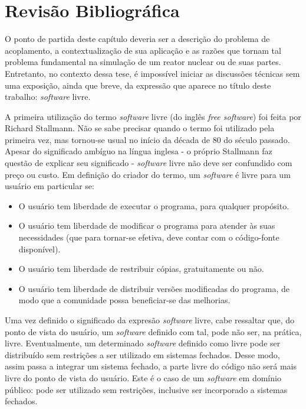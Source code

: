 \chapter{Revisão Bibliográfica}
\label{chap:rev}


O ponto de partida deste capítulo deveria ser a descrição do problema de acoplamento,
a contextualização de sua aplicação e as razões que tornam tal problema fundamental
na simulação de um reator nuclear ou de suas partes. Entretanto, no contexto dessa tese, é impossível
iniciar as discussões técnicas sem uma exposição, ainda que breve, da expressão que
aparece no título deste trabalho: \textit{software} livre.

A primeira utilização do termo \textit{software} livre (do inglês \textit{free software})
foi feita por Richard Stallmann. Não se sabe precisar quando o termo foi utilizado pela
primeira vez, mas tornou-se usual no início da década de 80 do século passado.
Apesar do significado ambíguo na língua inglesa - o próprio Stallmann faz questão
de explicar seu significado \cite{Stallman2002} - \textit{software} livre não deve
ser confundido com preço ou custo. Em definição do criador do termo, um \textit{software}
é livre para um usuário em particular se:
\begin{itemize}
\item O usuário tem liberdade de executar o programa, para qualquer propósito.
\item O usuário tem liberdade de modificar o programa para atender às suas necessidades
  (que para tornar-se efetiva, deve contar com o código-fonte disponível).
\item O usuário tem liberdade de restribuir cópias, gratuitamente ou não.
\item O usuário tem liberdade de distribuir versões modificadas do programa, de modo
  que a comunidade possa beneficiar-se das melhorias.
\end{itemize}

Uma vez definido o significado da expresão \textit{software} livre, cabe ressaltar que, do ponto de
vista do usuário, um \textit{software} definido com tal, pode não ser, na prática, livre.
Eventualmente, um determinado \textit{software} definido como livre pode ser distribuído sem
restrições a ser utilizado em sistemas
fechados. Desse modo, assim passa a integrar um sistema fechado, a parte livre do código não será mais livre do ponto de vista do usuário. Este é o caso de um \textit{software} em domínio público: pode ser utilizado sem restrições, inclusive ser incorporado a sistemas fechados.

